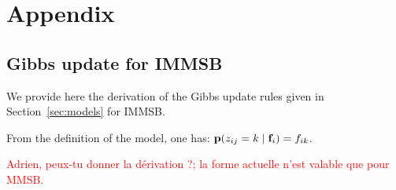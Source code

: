 \section{Appendix}

\subsection{Gibbs update for IMMSB}

We provide here the derivation of the Gibbs update rules given in Section~\ref{sec:models} for IMMSB.

From the definition of the model, one has: $\mathbf{p}(z_{ij} = k \mid \mathbf{f}_i) = f_{ik}$.

\textcolor{red}{Adrien, peux-tu donner la d\'erivation ?; la forme actuelle n'est valable que pour MMSB.} 

